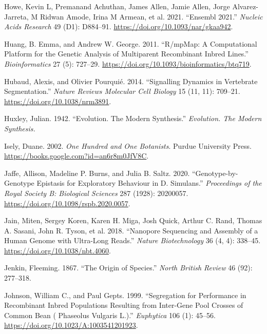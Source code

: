 \documentclass[
]{book}
\newlength{\cslhangindent}
\newlength{\cslentryspacingunit} %
\newenvironment{CSLReferences}[2] %
 {%
  \setlength{\parindent}{0pt}
  \ifodd #1
  \let\oldpar\par
  \def\par{\hangindent=\cslhangindent\oldpar}
  \fi
  \setlength{\parskip}{#2\cslentryspacingunit}
 }%
 {}
\begin{document}
\begin{CSLReferences}{1}{0}
\leavevmode{}%
Howe, Kevin L, Premanand Achuthan, James Allen, Jamie Allen, Jorge Alvarez-Jarreta, M Ridwan Amode, Irina M Armean, et al. 2021. {``Ensembl 2021.''} \emph{Nucleic Acids Research} 49 (D1): D884--91. \url{https://doi.org/10.1093/nar/gkaa942}.

\leavevmode{}%
Huang, B. Emma, and Andrew W. George. 2011. {``R/{mpMap}: A Computational Platform for the Genetic Analysis of Multiparent Recombinant Inbred Lines.''} \emph{Bioinformatics} 27 (5): 727--29. \url{https://doi.org/10.1093/bioinformatics/btq719}.

\leavevmode{}%
Hubaud, Alexis, and Olivier Pourquié. 2014. {``Signalling Dynamics in Vertebrate Segmentation.''} \emph{Nature Reviews Molecular Cell Biology} 15 (11, 11): 709--21. \url{https://doi.org/10.1038/nrm3891}.

\leavevmode{}%
Huxley, Julian. 1942. {``Evolution. {The} Modern Synthesis.''} \emph{Evolution. The Modern Synthesis.}

\leavevmode{}%
Isely, Duane. 2002. \emph{One {Hundred} and {One Botanists}}. {Purdue University Press}. \url{https://books.google.com?id=an6r8m0JfV8C}.

\leavevmode{}%
Jaffe, Allison, Madeline P. Burns, and Julia B. Saltz. 2020. {``Genotype-by-Genotype Epistasis for Exploratory Behaviour in {D}. Simulans.''} \emph{Proceedings of the Royal Society B: Biological Sciences} 287 (1928): 20200057. \url{https://doi.org/10.1098/rspb.2020.0057}.

\leavevmode{}%
Jain, Miten, Sergey Koren, Karen H. Miga, Josh Quick, Arthur C. Rand, Thomas A. Sasani, John R. Tyson, et al. 2018. {``Nanopore Sequencing and Assembly of a Human Genome with Ultra-Long Reads.''} \emph{Nature Biotechnology} 36 (4, 4): 338--45. \url{https://doi.org/10.1038/nbt.4060}.

\leavevmode{}%
Jenkin, Fleeming. 1867. {``The Origin of Species.''} \emph{North British Review} 46 (92): 277--318.

\leavevmode{}%
Johnson, William C., and Paul Gepts. 1999. {``Segregation for Performance in Recombinant Inbred Populations Resulting from Inter-Gene Pool Crosses of Common Bean ( {Phaseolus} Vulgaris {L}.).''} \emph{Euphytica} 106 (1): 45--56. \url{https://doi.org/10.1023/A:1003541201923}.


\end{CSLReferences}
\end{document}
